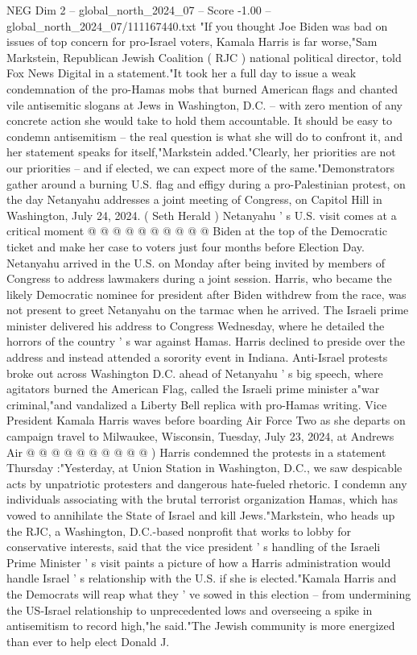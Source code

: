\begin{textsample}{NEG Dim 2 – global\_north\_2024\_07 – Score -1.00 – global\_north\_2024\_07/111167440.txt}  \label{ex:f2_neg_059}
"If you thought Joe Biden was bad on issues of top concern for pro-Israel voters, Kamala Harris is far worse,"Sam Markstein, Republican Jewish Coalition ( RJC ) national political director, told Fox News Digital in a statement."It took her a full day to issue a weak condemnation of the pro-Hamas mobs that burned American flags and chanted vile antisemitic slogans at Jews in Washington, D.C. -- with zero mention of any concrete action she would take to hold them accountable.
It should be easy to condemn antisemitism -- the real question is what she will do to confront it, and her statement speaks for itself,"Markstein added."Clearly, her priorities are not our priorities -- and if elected, we can expect more of the same."Demonstrators gather around a burning U.S. flag and effigy during a pro-Palestinian protest, on the day Netanyahu addresses a joint meeting of Congress, on Capitol Hill in Washington, July 24, 2024. ( Seth Herald ) Netanyahu ' s U.S. visit comes at a critical moment @ @ @ @ @ @ @ @ @ @ Biden at the top of the Democratic ticket and make her case to voters just four months before Election Day.
Netanyahu arrived in the U.S. on Monday after being invited by members of Congress to address lawmakers during a joint session.
Harris, who became the likely Democratic nominee for president after Biden withdrew from the race, was not present to greet Netanyahu on the tarmac when he arrived.
The Israeli prime minister delivered his address to Congress Wednesday, where he detailed the horrors of the country ' s war against Hamas.
Harris declined to preside over the address and instead attended a sorority event in Indiana.
Anti-Israel protests broke out across Washington D.C. ahead of Netanyahu ' s big speech, where agitators burned the American Flag, called the Israeli prime minister a"war criminal,"and vandalized a Liberty Bell replica with pro-Hamas writing.
Vice President Kamala Harris waves before boarding Air Force Two as she departs on campaign travel to Milwaukee, Wisconsin, Tuesday, July 23, 2024, at Andrews Air @ @ @ @ @ @ @ @ @ @ ) Harris condemned the protests in a statement Thursday :"Yesterday, at Union Station in Washington, D.C., we saw despicable acts by unpatriotic protesters and dangerous hate-fueled rhetoric.
I condemn any individuals associating with the brutal terrorist organization Hamas, which has vowed to annihilate the State of Israel and kill Jews."Markstein, who heads up the RJC, a Washington, D.C.-based nonprofit that works to lobby for conservative interests, said that the vice president ' s handling of the Israeli Prime Minister ' s visit paints a picture of how a Harris administration would handle Israel ' s relationship with the U.S. if she is elected."Kamala Harris and the Democrats will reap what they ' ve sowed in this election -- from undermining the US-Israel relationship to unprecedented lows and overseeing a spike in antisemitism to record high,"he said."The Jewish community is more energized than ever to help elect Donald J.

\end{textsample}
